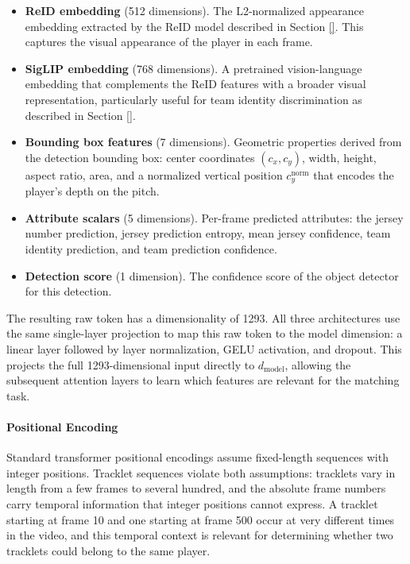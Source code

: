 \begin{itemize}
    \item \textbf{ReID embedding} (512 dimensions). The L2-normalized appearance embedding extracted by the ReID model described in Section \ref{}. This captures the visual appearance of the player in each frame.

    \item \textbf{SigLIP embedding} (768 dimensions). A pretrained vision-language embedding that complements the ReID features with a broader visual representation, particularly useful for team identity discrimination as described in Section \ref{}.

    \item \textbf{Bounding box features} (7 dimensions). Geometric properties derived from the detection bounding box: center coordinates $(c_x, c_y)$, width, height, aspect ratio, area, and a normalized vertical position $c_y^{\text{norm}}$ that encodes the player's depth on the pitch.

    \item \textbf{Attribute scalars} (5 dimensions). Per-frame predicted attributes: the jersey number prediction, jersey prediction entropy, mean jersey confidence, team identity prediction, and team prediction confidence.

    \item \textbf{Detection score} (1 dimension). The confidence score of the object detector for this detection.
\end{itemize}

The resulting raw token has a dimensionality of 1293. All three architectures use the same single-layer projection to map this raw token to the model dimension: a linear layer followed by layer normalization, GELU activation, and dropout. This projects the full 1293-dimensional input directly to $d_{\text{model}}$, allowing the subsequent attention layers to learn which features are relevant for the matching task.

\paragraph{Positional Encoding}\label{par:pos_encoding}
Standard transformer positional encodings assume fixed-length sequences with integer positions. Tracklet sequences violate both assumptions: tracklets vary in length from a few frames to several hundred, and the absolute frame numbers carry temporal information that integer positions cannot express. A tracklet starting at frame 10 and one starting at frame 500 occur at very different times in the video, and this temporal context is relevant for determining whether two tracklets could belong to the same player.

